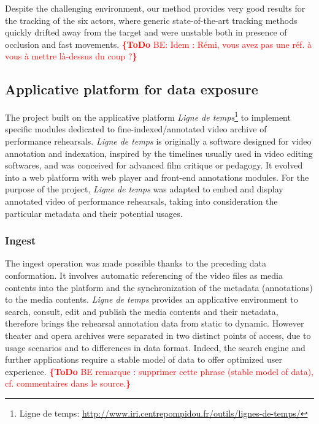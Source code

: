 \documentclass[conference]{IEEEtran}
\newcommand{\todo}[1]{\noindent\textcolor{red}{{\bf \{ToDo} #1{\bf \}}}}
\begin{document}
Despite the challenging environment, our method provides very good results for the tracking of the six actors, where generic state-of-the-art tracking methods quickly drifted away from the target and were unstable both in presence of occlusion and fast movements. 
\todo{BE: Idem : Rémi, vous avez pas une réf. à vous à mettre là-dessus du coup ?}



\subsection{Applicative platform for data exposure}
The project built on the applicative platform \emph{Ligne de temps}\footnote{Ligne de temps: \url{http://www.iri.centrepompidou.fr/outils/lignes-de-temps/}} to implement specific modules dedicated to fine-indexed/annotated video archive of performance rehearsals. \emph{Ligne de temps} is originally a software designed for video annotation and indexation, inspired by the timelines usually used in video editing softwares, and was conceived for advanced film critique or pedagogy. It evolved into a web platform with web player and front-end annotations modules. For the purpose of the project, \emph{Ligne de temps} was adapted to embed and display annotated video of performance rehearsals, taking into consideration the particular metadata and their potential usages.

\subsubsection{Ingest}
The ingest operation was made possible thanks to the preceding data conformation. It involves automatic referencing of the video files as media contents into the platform and the synchronization of the metadata (annotations) to the media contents. \emph{Ligne de temps} provides an applicative environment to search, consult, edit and publish the media contents and their metadata, therefore brings the rehearsal annotation data from static to dynamic. \linebreak
However theater and opera archives were separated in two distinct points of access, due to usage scenarios and to differences in data format.
 Indeed, the search engine and further applications require a stable model of data to offer optimized user experience.
\todo{BE remarque : supprimer cette phrase (stable model of data), cf. commentaires dans le source.}
\end{document}
